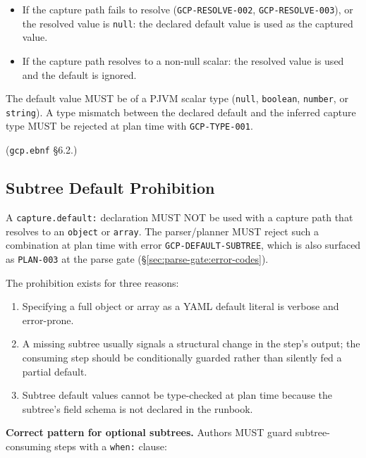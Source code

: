 \begin{itemize}
  \item If the capture path fails to resolve
    (\texttt{GCP-RESOLVE-002}, \texttt{GCP-RESOLVE-003}),
    or the resolved value is \texttt{null}:
    the declared default value is used as the captured value.
  \item If the capture path resolves to a non-null scalar:
    the resolved value is used and the default is ignored.
\end{itemize}

The default value MUST be of a PJVM scalar type
(\texttt{null}, \texttt{boolean}, \texttt{number}, or \texttt{string}).
A type mismatch between the declared default and the inferred capture type
MUST be rejected at plan time with \texttt{GCP-TYPE-001}.

(\texttt{gcp.ebnf} \S6.2.)

\subsection{Subtree Default Prohibition}
\label{subsec:gcp:default:subtree}

A \texttt{capture.default:} declaration MUST NOT be used with a capture
path that resolves to an \texttt{object} or \texttt{array}.
The parser/planner MUST reject such a combination at plan time with error
\texttt{GCP-DEFAULT-SUBTREE}, which is also surfaced as \texttt{PLAN-003}
at the parse gate (\S\ref{sec:parse-gate:error-codes}).

The prohibition exists for three reasons:

\begin{enumerate}
  \item Specifying a full object or array as a YAML default literal is
    verbose and error-prone.
  \item A missing subtree usually signals a structural change in the
    step's output; the consuming step should be conditionally guarded
    rather than silently fed a partial default.
  \item Subtree default values cannot be type-checked at plan time because
    the subtree's field schema is not declared in the runbook.
\end{enumerate}

\noindent\textbf{Correct pattern for optional subtrees.}
Authors MUST guard subtree-consuming steps with a \texttt{when:} clause:

